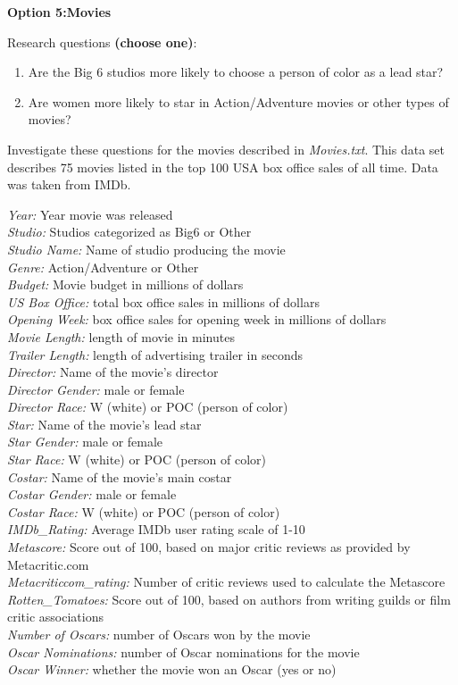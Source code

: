 \textbf{Option 5:Movies}


Research questions \textbf{(choose one)}:
\begin{enumerate}
\item Are the Big 6 studios more likely to choose a person of color as a lead star? 
\item Are women more likely to star in Action/Adventure movies or other types of movies?
\end{enumerate}

Investigate these questions for the movies described in \emph{Movies.txt}. This data set describes 75 movies listed in the top 100 USA box office sales of all time. Data was taken from IMDb.

\emph{Year:} Year movie was released\\
\emph{Studio:} Studios categorized as Big6 or Other \\
\emph{Studio Name:} Name of studio producing the movie\\
\emph{Genre:} Action/Adventure or Other\\
\emph{Budget:} Movie budget in millions of dollars\\
\emph{US Box Office:} total box office sales in millions of dollars\\
\emph{Opening Week:} box office sales for opening week in millions of dollars\\
\emph{Movie Length:} length of movie in minutes\\
\emph{Trailer Length:} length of advertising trailer in seconds\\
\emph{Director:} Name of the movie's director\\
\emph{Director Gender:} male or female\\
\emph{Director Race:} W (white) or POC (person of color)\\
\emph{Star:} Name of the movie's lead star\\
\emph{Star Gender:} male or female\\
\emph{Star Race:} W (white) or POC (person of color) \\
\emph{Costar:} Name of the movie's main costar\\
\emph{Costar Gender:} male or female\\
\emph{Costar Race:} W (white) or POC (person of color)\\
\emph{IMDb\_Rating:} Average IMDb user rating scale of 1-10\\
\emph{Metascore:} Score out of 100, based on major critic reviews as provided by Metacritic.com\\
\emph{Metacriticcom\_rating:} Number of critic reviews used to calculate the Metascore\\
\emph{Rotten\_Tomatoes:} Score out of 100, based on authors from writing guilds or film critic associations\\
\emph{Number of Oscars:} number of Oscars won by the movie\\
\emph{Oscar Nominations:} number of Oscar nominations for the movie\\
\emph{Oscar Winner:} whether the movie won an Oscar (yes or no)\\


